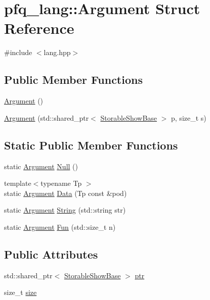 \hypertarget{structpfq__lang_1_1Argument}{\section{pfq\+\_\+lang\+:\+:Argument Struct Reference}
\label{structpfq__lang_1_1Argument}
}


{\ttfamily \#include $<$lang.\+hpp$>$}

\subsection*{Public Member Functions}
\begin{DoxyCompactItemize}
\item 
\hyperlink{structpfq__lang_1_1Argument_adf4a0f9046574c815af1031d6c5cd851}{Argument} ()
\item 
\hyperlink{structpfq__lang_1_1Argument_ab9a04c30f32a454c5ac992c47774efca}{Argument} (std\+::shared\+\_\+ptr$<$ \hyperlink{structpfq__lang_1_1StorableShowBase}{Storable\+Show\+Base} $>$ p, size\+\_\+t s)
\end{DoxyCompactItemize}
\subsection*{Static Public Member Functions}
\begin{DoxyCompactItemize}
\item 
static \hyperlink{structpfq__lang_1_1Argument}{Argument} \hyperlink{structpfq__lang_1_1Argument_a8efc5284160dc24e835ed65b40d988fa}{Null} ()
\item 
{\footnotesize template$<$typename Tp $>$ }\\static \hyperlink{structpfq__lang_1_1Argument}{Argument} \hyperlink{structpfq__lang_1_1Argument_abea434bf421fbbb77e8d6ca473157763}{Data} (Tp const \&pod)
\item 
static \hyperlink{structpfq__lang_1_1Argument}{Argument} \hyperlink{structpfq__lang_1_1Argument_ae348374ab6b6842216f54f93c17685e0}{String} (std\+::string str)
\item 
static \hyperlink{structpfq__lang_1_1Argument}{Argument} \hyperlink{structpfq__lang_1_1Argument_afc98cc699af5ba4ff12d708410e575f0}{Fun} (std\+::size\+\_\+t n)
\end{DoxyCompactItemize}
\subsection*{Public Attributes}
\begin{DoxyCompactItemize}
\item 
std\+::shared\+\_\+ptr$<$ \hyperlink{structpfq__lang_1_1StorableShowBase}{Storable\+Show\+Base} $>$ \hyperlink{structpfq__lang_1_1Argument_aff346dc6099b99a4593e9ae78f5272b0}{ptr}
\item 
size\+\_\+t \hyperlink{structpfq__lang_1_1Argument_a32994135620ce25900736514464f04f4}{size}
\end{DoxyCompactItemize}


